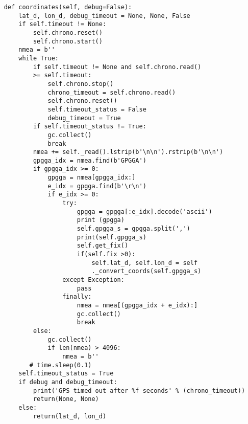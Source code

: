 \begin{appendices}
\begin{lstlisting}
    def coordinates(self, debug=False):
        lat_d, lon_d, debug_timeout = None, None, False
        if self.timeout != None:
            self.chrono.reset()
            self.chrono.start()
        nmea = b''
        while True:
            if self.timeout != None and self.chrono.read() 
            >= self.timeout:
                self.chrono.stop()
                chrono_timeout = self.chrono.read()
                self.chrono.reset()
                self.timeout_status = False
                debug_timeout = True
            if self.timeout_status != True:
                gc.collect()
                break
            nmea += self._read().lstrip(b'\n\n').rstrip(b'\n\n')
            gpgga_idx = nmea.find(b'GPGGA')
            if gpgga_idx >= 0:
                gpgga = nmea[gpgga_idx:]
                e_idx = gpgga.find(b'\r\n')
                if e_idx >= 0:
                    try:
                        gpgga = gpgga[:e_idx].decode('ascii')
                        print (gpgga)
                        self.gpgga_s = gpgga.split(',')
                        print(self.gpgga_s)
                        self.get_fix()
                        if(self.fix >0):
                            self.lat_d, self.lon_d = self
                            ._convert_coords(self.gpgga_s)
                    except Exception:
                        pass
                    finally:
                        nmea = nmea[(gpgga_idx + e_idx):]
                        gc.collect()
                        break
            else:
                gc.collect()
                if len(nmea) > 4096:
                    nmea = b''
           # time.sleep(0.1)
        self.timeout_status = True
        if debug and debug_timeout:
            print('GPS timed out after %f seconds' % (chrono_timeout))
            return(None, None)
        else:
            return(lat_d, lon_d)


\end{lstlisting}
\label{Appendix:L76GNSS.py}
\end{appendices}



